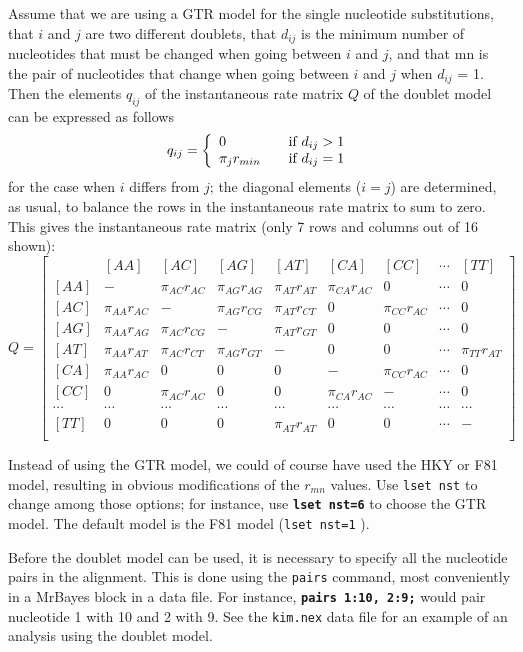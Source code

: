 \documentclass[12pt]{book}
\newcommand{\ttt}[1]{\texttt{#1} }
\newcommand{\tb}[1]{\ttt{\textbf{#1}} }
\begin{document}
Assume that we are using a GTR model for the single nucleotide substitutions, that $i$ and $j$ are
two different doublets, that $d_{ij}$ is the minimum number of nucleotides that must be changed
when going between $i$ and $j$, and that mn is the pair of nucleotides that change when going
between $i$ and $j$ when $d_{ij}$ = 1. Then the elements $q_{ij}$ of the instantaneous rate matrix
$Q$ of the doublet model can be expressed as follows
\[
q_{ij} = \left\{ 
\begin{array}{l l}
  0 & \quad \text{if} ~d_{ij}>1 \\
 \pi_j r_{min} & \quad \text{if} ~d_{ij}=1\\
\end{array} \right.
\]
for the case when $i$ differs from $j$; the diagonal elements ($i = j$) are determined, as usual,
to balance the rows in the instantaneous rate matrix to sum to zero. This gives the
instantaneous rate matrix (only 7 rows and columns out of 16 shown):
\[
Q=\begin{bmatrix}
    & [AA] & [AC] & [AG] & [AT] & [CA] & [CC] & \cdots & [TT]\\ 
 [AA]& - & \pi_{AC} r_{AC} & \pi_{AG} r_{AG} & \pi_{AT} r_{AT}& \pi_{CA} r_{AC} & 0 & \cdots & 0\\ 
 [AC]& \pi_{AA} r_{AC} & - & \pi_{AG} r_{CG} & \pi_{AT} r_{CT}& 0 & \pi_{CC} r_{AC} & \cdots & 0\\ 
 [AG]& \pi_{AA} r_{AG} & \pi_{AC} r_{CG} & - & \pi_{AT} r_{GT}& 0 & 0 & \cdots & 0 \\ 
 [AT]& \pi_{AA} r_{AT} & \pi_{AC} r_{CT} & \pi_{AG} r_{GT}& -& 0 & 0 & \cdots &  \pi_{TT} r_{AT}\\
 [CA]& \pi_{AA} r_{AC} & 0 & 0 & 0 & - &  \pi_{CC} r_{AC} & \cdots & 0\\
 [CC]& 0 & \pi_{AC} r_{AC} & 0 & 0 & \pi_{CA} r_{AC} & -  & \cdots & 0\\
 \cdots& \cdots& \cdots& \cdots& \cdots& \cdots& \cdots& \cdots& \cdots\\
 [TT]& 0 & 0 & 0 &\pi_{AT} r_{AT} & 0 & 0 & \cdots & -\\
\end{bmatrix}
\]

Instead of using the GTR model, we could of course have used the HKY or F81 model, resulting in
obvious modifications of the $r_{mn}$ values. Use \ttt{lset nst} to change among those options; for
instance, use \tb{lset nst=6} to choose the GTR model. The default model is the F81 model
(\ttt{lset nst=1}).

Before the doublet model can be used, it is necessary to specify all the nucleotide pairs in the
alignment. This is done using the \ttt{pairs} command, most conveniently in a MrBayes block in a
data file. For instance, \tb{pairs 1:10, 2:9;} would pair nucleotide 1 with 10 and 2 with 9. See
the \ttt{kim.nex} data file for an example of an analysis using the doublet model.
\end{document}
